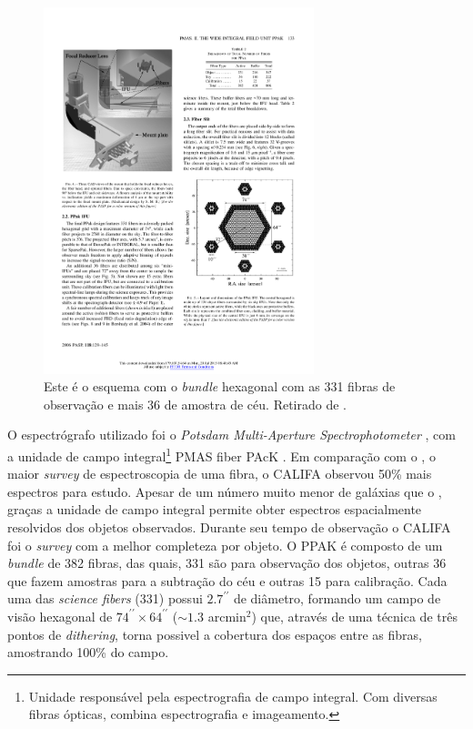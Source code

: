 \begin{figure}
	\includegraphics[width=0.7\textwidth]{figuras/PPAK}
	\caption[Distribuição das fibras no instrumento PMAS/PPAK]
  {Este é o esquema com o {\em bundle} hexagonal com as 331 fibras de observação e mais 36 de amostra de céu. Retirado
  de \citet{Kelz2006}.}
	\label{fig:PPAK}
\end{figure}

O espectrógrafo utilizado foi o {\em Potsdam Multi-Aperture Spectrophotometer} \citep[PMAS;][]{Roth2005, Roth2010}, com a unidade de campo integral\footnote{Unidade responsável pela espectrografia de campo integral. Com diversas fibras ópticas, combina espectrografia e imageamento.} PMAS fiber PAcK \citep[PPAK;][Figura \ref{fig:PPAK}]{Verheijen2004, Kelz2006}. Em comparação com o \SDSS, o maior {\em survey} de espectroscopia de uma fibra, o CALIFA observou 50\% mais espectros para estudo. Apesar de um número muito menor de galáxias que o \SDSS, graças a unidade de campo integral permite obter espectros espacialmente resolvidos dos objetos observados. Durante seu tempo de observação o CALIFA foi o {\em survey} com a melhor completeza por objeto. O PPAK é composto de um {\em bundle} de 382 fibras, das quais, 331 são para observação dos objetos, outras 36 que fazem amostras para a subtração do céu e outras 15 para calibração. Cada uma das {\em science fibers} (331) possui $2.7^{\prime\prime}$ de diâmetro, formando um campo de visão hexagonal de $74^{\prime\prime} \times 64^{\prime\prime}$ ($\sim1.3$ arcmin$^2$) que, através de uma técnica de três pontos de {\em dithering}, torna possivel a cobertura dos espaços entre as fibras, amostrando 100\% do campo.

